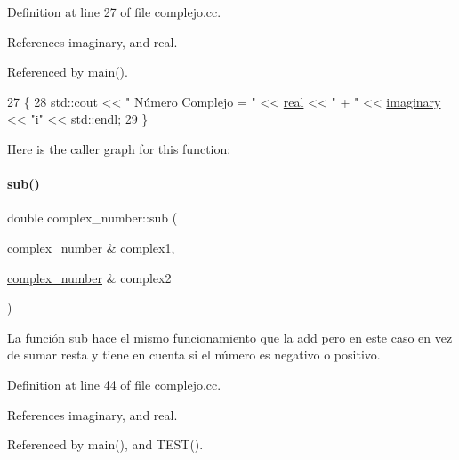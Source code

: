 Definition at line 27 of file complejo.\+cc.



References imaginary, and real.



Referenced by main().


\begin{DoxyCode}
27                           \{
28   std::cout << \textcolor{stringliteral}{" Número Complejo = "} << \hyperlink{classcomplex__number_a57a6f97bb6028f8f98c321514d2aa7a0}{real} << \textcolor{stringliteral}{" + "} << \hyperlink{classcomplex__number_a809ebdf297fb9093cf4c6f1e2728be90}{imaginary} << \textcolor{stringliteral}{"i"} << std::endl;
29 \}
\end{DoxyCode}
Here is the caller graph for this function\+:
\mbox{\label{classcomplex__number_a556956d95765b498f92c44b16ae4a573}} 
\paragraph{\texorpdfstring{sub()}{sub()}}
{\footnotesize\ttfamily double complex\+\_\+number\+::sub (\begin{DoxyParamCaption}\item[{\hyperlink{classcomplex__number}{complex\+\_\+number} \&}]{complex1,  }\item[{\hyperlink{classcomplex__number}{complex\+\_\+number} \&}]{complex2 }\end{DoxyParamCaption})}



La función sub hace el mismo funcionamiento que la add pero en este caso en vez de sumar resta y tiene en cuenta si el número es negativo o positivo. 



Definition at line 44 of file complejo.\+cc.



References imaginary, and real.



Referenced by main(), and T\+E\+S\+T().



